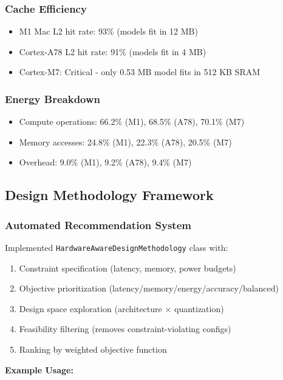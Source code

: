 \documentclass[10pt, a4paper]{article}
\begin{document}
\subsubsection{Cache Efficiency}
\begin{itemize}
    \item M1 Mac L2 hit rate: 93\% (models fit in 12 MB)
    \item Cortex-A78 L2 hit rate: 91\% (models fit in 4 MB)
    \item Cortex-M7: Critical - only 0.53 MB model fits in 512 KB SRAM
\end{itemize}

\subsubsection{Energy Breakdown}
\begin{itemize}
    \item Compute operations: 66.2\% (M1), 68.5\% (A78), 70.1\% (M7)
    \item Memory accesses: 24.8\% (M1), 22.3\% (A78), 20.5\% (M7)
    \item Overhead: 9.0\% (M1), 9.2\% (A78), 9.4\% (M7)
\end{itemize}

\subsection{Design Methodology Framework}

\subsubsection{Automated Recommendation System}

Implemented \texttt{HardwareAwareDesignMethodology} class with:
\begin{enumerate}
    \item Constraint specification (latency, memory, power budgets)
    \item Objective prioritization (latency/memory/energy/accuracy/balanced)
    \item Design space exploration (architecture $\times$ quantization)
    \item Feasibility filtering (removes constraint-violating configs)
    \item Ranking by weighted objective function
\end{enumerate}

\textbf{Example Usage:}

\end{document}
